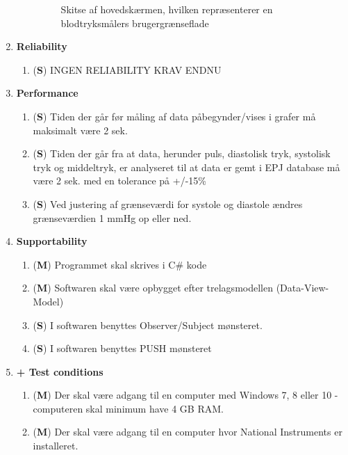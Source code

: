 \begin{enumerate}
\begin{enumerate}
\begin{figure}[h!]
\caption{Skitse af hovedskærmen, hvilken repræsenterer en blodtryksmålers brugergrænseflade}
\end{figure}
\end{enumerate}
\item \textbf{Reliability}
\begin{enumerate}
\item (\textbf{S}) INGEN RELIABILITY KRAV ENDNU
\end{enumerate}
\item \textbf{Performance}
\begin{enumerate}
\item (\textbf{S}) Tiden der går før måling af data påbegynder/vises i grafer må maksimalt være 2 sek.
\item (\textbf{S}) Tiden der går fra at data, herunder puls, diastolisk tryk, systolisk tryk og middeltryk, er analyseret til at data er gemt i EPJ database må være 2 sek. med en tolerance på +/-15\% 
\item (\textbf{S}) Ved justering af grænseværdi for systole og diastole ændres grænseværdien 1 mmHg op eller ned.                                                                                                                                                                                                                                                                                                                                                                                                                                                                                                                                                                                                                                                                                               
\end{enumerate}
\item \textbf{Supportability}
\begin{enumerate}
\item (\textbf{M}) Programmet skal skrives i C\# kode
\item (\textbf{M}) Softwaren skal være opbygget efter trelagsmodellen (Data-View-Model)
\item (\textbf{S}) I softwaren benyttes Observer/Subject mønsteret.
\item (\textbf{S}) I softwaren benyttes PUSH mønsteret
\end{enumerate}
\item \textbf{+ Test conditions}
\begin{enumerate}
\item (\textbf{M}) Der skal være adgang til en computer med Windows 7, 8 eller 10 - computeren skal minimum have 4 GB RAM.
\item (\textbf{M}) Der skal være adgang til en computer hvor National Instruments er installeret.
\end{enumerate}
\end{enumerate}
